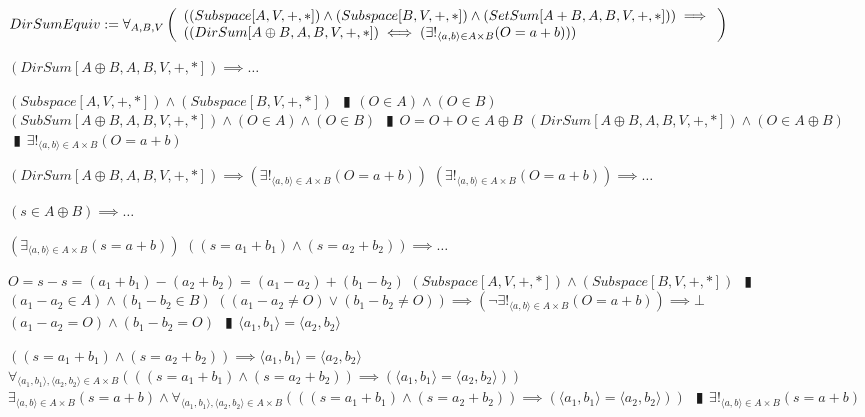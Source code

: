 \documentclass{book}
\newcommand{\abr}{:=}
\newcommand{\pipe}{$\phantom{(}\vrectangleblack\phantom{)}$}
\begin{document}
\begin{shaded}
  $DirSumEquiv \abr \forall_{A, B, V}\left(\begin{array}{ll}
    ((Subspace[A, V, +, *]) \land (Subspace[B, V, +, *]) \land (SetSum[A + B, A, B, V, +, *])) \hfill \implies \hfill \\
    ((DirSum[A \oplus B, A, B, V, +, *]) \iff (\exists!_{\langle a, b \rangle \in A \times B}(O = a + b)))
  \end{array}\right)$
  \begin{enumerate}
    \lit $(DirSum[A \oplus B, A, B, V, +, *]) \implies \ldots$
    \begin{enumerate}
      \lit $(Subspace[A, V, +, *]) \land (Subspace[B, V, +, *])$ \pipe $(O \in A) \land (O \in B)$
      \lit $(SubSum[A \oplus B, A, B, V, +, *]) \land (O \in A) \land (O \in B)$ \pipe $O = O + O \in A \oplus B$
      \lit $(DirSum[A \oplus B, A, B, V, +, *]) \land (O \in A \oplus B)$ \pipe $\exists!_{\langle a, b \rangle \in A \times B}(O = a + b)$
    \end{enumerate}
    \lit $(DirSum[A \oplus B, A, B, V, +, *]) \implies (\exists!_{\langle a, b \rangle \in A \times B}(O = a + b))$
    \lit $(\exists!_{\langle a, b \rangle \in A \times B}(O = a + b)) \implies \ldots$
    \begin{enumerate}
      \lit $(s \in A \oplus B) \implies \ldots$
      \begin{enumerate}
        \lit $(\exists_{\langle a, b \rangle \in A \times B}(s = a + b))$
        \lit $((s = a_1 + b_1) \land (s = a_2 + b_2)) \implies \ldots$
        \begin{enumerate}
          \lit $O = s - s = (a_1 + b_1) - (a_2 + b_2) = (a_1 - a_2) + (b_1 - b_2)$
          \lit $(Subspace[A, V, +, *]) \land (Subspace[B, V, +, *])$ \pipe $(a_1 - a_2 \in A) \land (b_1 - b_2 \in B)$
          \lit $((a_1 - a_2 \neq O) \lor (b_1 - b_2 \neq O)) \implies (\lnot \exists!_{\langle a, b \rangle \in A \times B}(O = a + b)) \implies \bot$
          \lit $(a_1 - a_2 = O) \land (b_1 - b_2 = O)$ \pipe $\langle a_1, b_1 \rangle = \langle a_2, b_2 \rangle$
        \end{enumerate}
        \lit $((s = a_1 + b_1) \land (s = a_2 + b_2)) \implies \langle a_1, b_1 \rangle = \langle a_2, b_2 \rangle$
        \lit $\forall_{\langle a_1, b_1 \rangle, \langle a_2, b_2 \rangle \in A \times B}(((s = a_1 + b_1) \land (s = a_2 + b_2)) \implies (\langle a_1, b_1 \rangle = \langle a_2, b_2 \rangle))$
        \lit $\exists_{\langle a, b \rangle \in A \times B}(s = a + b) \land \forall_{\langle a_1, b_1 \rangle, \langle a_2, b_2 \rangle \in A \times B}(((s = a_1 + b_1) \land (s = a_2 + b_2)) \implies (\langle a_1, b_1 \rangle = \langle a_2, b_2 \rangle))$ \pipe $\exists!_{\langle a, b \rangle \in A \times B}(s = a + b)$

\end{enumerate}
\end{enumerate}
\end{enumerate}
\end{shaded}
\end{document}
